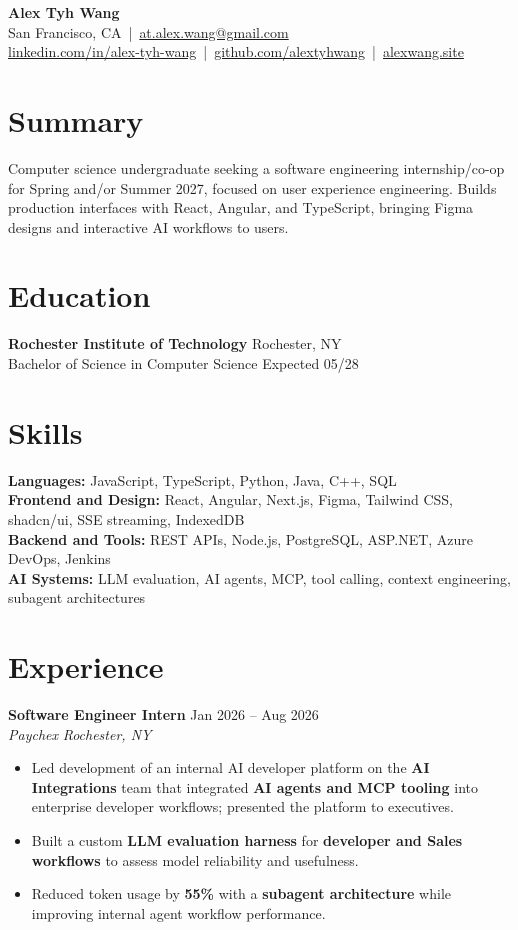 \documentclass[10pt,letterpaper]{article}
\newif\ifresumeFirstRole
\newcommand{\resumeRole}[4]{%
  \ifresumeFirstRole
    \global\resumeFirstRolefalse
  \else
    \vspace{0pt plus 1fill}%
  \fi
  \textbf{#1} \hfill #2\\
  \textit{#3} \hfill \textit{#4}
}
\begin{document}
\begin{center}
{\Large \textbf{Alex Tyh Wang}}\\
San Francisco, CA \,|\, \href{mailto:at.alex.wang@gmail.com}{at.alex.wang@gmail.com}\\
\small \href{https://www.linkedin.com/in/alex-tyh-wang/}{linkedin.com/in/alex-tyh-wang} \,|\, \href{https://github.com/alextyhwang}{github.com/alextyhwang} \,|\, \href{https://alexwang.site}{alexwang.site}
\end{center}

\section*{Summary}
Computer science undergraduate seeking a software engineering internship/co-op for Spring and/or Summer 2027, focused on user experience engineering. Builds production interfaces with React, Angular, and TypeScript, bringing Figma designs and interactive AI workflows to users.

\section*{Education}
\textbf{Rochester Institute of Technology} \hfill Rochester, NY\\
Bachelor of Science in Computer Science \hfill Expected 05/28

\section*{Skills}
\textbf{Languages:} JavaScript, TypeScript, Python, Java, C++, SQL\\
\textbf{Frontend and Design:} React, Angular, Next.js, Figma, Tailwind CSS, shadcn/ui, SSE streaming, IndexedDB\\
\textbf{Backend and Tools:} REST APIs, Node.js, PostgreSQL, ASP.NET, Azure DevOps, Jenkins\\
\textbf{AI Systems:} LLM evaluation, AI agents, MCP, tool calling, context engineering, subagent architectures

\section*{Experience}
\resumeRole{Software Engineer Intern}{Jan 2026 -- Aug 2026}{Paychex}{Rochester, NY}
\begin{itemize}
  \item Led development of an internal AI developer platform on the \textbf{AI Integrations} team that integrated \textbf{AI agents and MCP tooling} into enterprise developer workflows; presented the platform to executives.
  \item Built a custom \textbf{LLM evaluation harness} for \textbf{developer and Sales workflows} to assess model reliability and usefulness.
  \item Reduced token usage by \textbf{55\%} with a \textbf{subagent architecture} while improving internal agent workflow performance.
\end{itemize}
\end{document}

